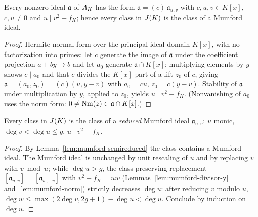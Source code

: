 \begin{lemma}
\label{lem:mumford-semireduced}
\leanok
{}
Every nonzero ideal $\mathfrak a$ of $A_{K}$ has the form
$\mathfrak a = (c)\,\mathfrak a_{u,v}$ with $c, u, v \in K[x]$, $c, u \ne 0$ and
$u \mid v^2 - f_K$; hence every class in $J(K)$ is the class of a Mumford ideal.
\end{lemma}
\begin{proof}
\leanok
Hermite normal form over the principal ideal domain $K[x]$, with no factorization into
primes: let $c$ generate the image of $\mathfrak a$ under the coefficient projection
$a + by \mapsto b$ and let $a_0$ generate $\mathfrak a \cap K[x]$; multiplying elements
by $y$ shows $c \mid a_0$ and that $c$ divides the $K[x]$-part of a lift $z_0$ of $c$,
giving $\mathfrak a = (a_0, z_0) = (c)(u, y - v)$ with $a_0 = cu$, $z_0 = c(y-v)$.
Stability of $\mathfrak a$ under multiplication by $y$, applied to $z_0$, yields
$u \mid v^2 - f_K$. (Nonvanishing of $a_0$ uses the norm form:
$0 \ne \operatorname{Nm}(z) \in \mathfrak a \cap K[x]$.)
\end{proof}

\begin{lemma}
\label{lem:mumford-reduce}
\leanok
{}
Every class in $J(K)$ is the class of a \emph{reduced} Mumford ideal
$\mathfrak a_{u,v}$: $u$ monic, $\deg v < \deg u \le g$, $u \mid v^2 - f_K$.
\end{lemma}
\begin{proof}
\leanok
By Lemma~\ref{lem:mumford-semireduced} the class contains a Mumford ideal. The Mumford
ideal is unchanged by unit rescaling of $u$ and by replacing $v$ with $v \bmod u$;
while $\deg u > g$, the class-preserving replacement
$[\mathfrak a_{u,v}] = [\mathfrak a_{w,-v}]$ with $v^2 - f_K = uw$
(Lemmas~\ref{lem:mumford-divisor-y} and~\ref{lem:mumford-norm}) strictly decreases
$\deg u$: after reducing $v$ modulo $u$,
$\deg w \le \max(2\deg v, 2g+1) - \deg u < \deg u$. Conclude by induction on $\deg u$.
\end{proof}

